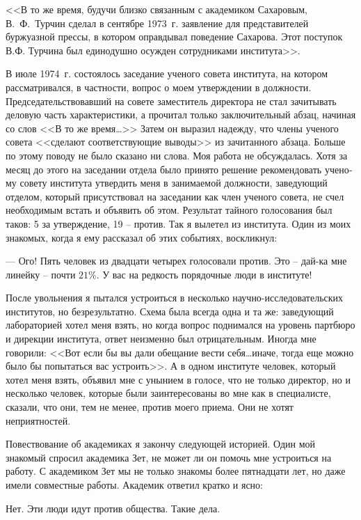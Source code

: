 \documentclass{book}
\begin{document}
<<В то же время, будучи близко связанным с академиком Сахаровым, В.~Ф.~Турчин сделал в сентябре 1973~г. заявление для представителей буржуазной прессы, в котором оправды­вал поведение Сахарова. Этот поступок В.Ф. Турчина был еди­нодушно осужден сотрудниками института>>.

В июле 1974~г. состоялось заседание ученого совета инсти­тута, на котором рассматривался, в частности, вопрос о моем утверждении в должности. Председательствовавший на совете заместитель директора не стал зачитывать деловую часть харак­теристики, а прочитал только заключительный абзац, начиная со слов <<В то же время\ldots>> Затем он выразил надежду, что члены ученого совета <<сделают соответствующие выводы>> из зачи­танного абзаца. Больше по этому поводу не было сказано ни слова. Моя работа не обсуждалась. Хотя за месяц до этого на заседании отдела было принято решение рекомендовать учено­му совету института утвердить меня в занимаемой должности, заведующий отделом, который присутствовал на заседании как член ученого совета, не счел необходимым встать и объя­вить об этом. Результат тайного голосования был таков: 5 за утверждение, 19 -- против. Так я вылетел из института.
Один из моих знакомых, когда я ему рассказал об этих со­бытиях, воскликнул:

--- Ого! Пять человек из двадцати четырех голосовали про­тив. Это -- дай-ка мне линейку -- почти $21\%$. У вас на редкость порядочные люди в институте!

После увольнения я пытался устроиться в несколько науч­но-исследовательских институтов, но безрезультатно. Схема была всегда одна и та же: заведующий лабораторией хотел меня взять, но когда вопрос поднимался на уровень партбюро и дирекции института, ответ неизменно был отрицательным. Иногда мне говорили: <<Вот если бы вы дали обещание вести себя\ldots иначе, тогда еще можно было бы попытаться вас устро­ить>>. А в одном институте человек, который хотел меня взять, объявил мне с унынием в голосе, что не только директор, но и несколько человек, которые были заинтересованы во мне как в специалисте, сказали, что они, тем не менее, против моего приема. Они не хотят неприятностей.

Повествование об академиках я закончу следующей исто­рией. Один мой знакомый спросил академика Зет, не может ли он помочь мне 
устроиться на работу. С академиком Зет мы не только знакомы более пятнадцати лет, но даже имели сов­местные работы. Академик 
ответил кратко и ясно:

Нет. Эти люди идут против общества. Такие дела.
\end{document}
